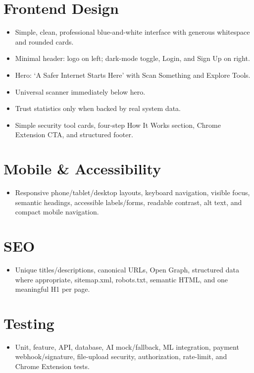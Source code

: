 \documentclass[11pt,a4paper]{article}
\begin{document}
\section{Frontend Design}
\begin{itemize}[noitemsep]
    \item Simple, clean, professional blue-and-white interface with generous whitespace and rounded cards.
    \item Minimal header: logo on left; dark-mode toggle, Login, and Sign Up on right.
    \item Hero: `A Safer Internet Starts Here' with Scan Something and Explore Tools.
    \item Universal scanner immediately below hero.
    \item Trust statistics only when backed by real system data.
    \item Simple security tool cards, four-step How It Works section, Chrome Extension CTA, and structured footer.
\end{itemize}

\section{Mobile \& Accessibility}
\begin{itemize}[noitemsep]
    \item Responsive phone/tablet/desktop layouts, keyboard navigation, visible focus, semantic headings, accessible labels/forms, readable contrast, alt text, and compact mobile navigation.
\end{itemize}

\section{SEO}
\begin{itemize}[noitemsep]
    \item Unique titles/descriptions, canonical URLs, Open Graph, structured data where appropriate, sitemap.xml, robots.txt, semantic HTML, and one meaningful H1 per page.
\end{itemize}

\section{Testing}
\begin{itemize}[noitemsep]
    \item Unit, feature, API, database, AI mock/fallback, ML integration, payment webhook/signature, file-upload security, authorization, rate-limit, and Chrome Extension tests.
\end{itemize}
\end{document}
